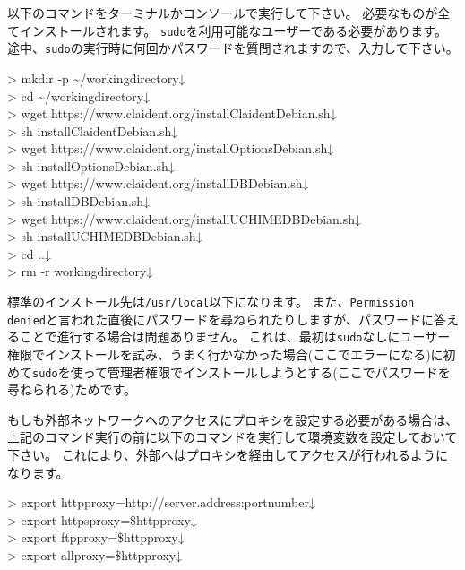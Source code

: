 \documentclass[titlepage,10pt,a4paper]{jsbook}
\newenvironment{cmd}{\begin{oframed}\raggedright\ttfamily\footnotesize\setlength{\baselineskip}{1.4em}}{\end{oframed}\vspace{-1em}}
\begin{document}
以下のコマンドをターミナルかコンソールで実行して下さい。
必要なものが全てインストールされます。
\texttt{sudo}を利用可能なユーザーである必要があります。
途中、\texttt{sudo}の実行時に何回かパスワードを質問されますので、入力して下さい。

\begin{cmd}
{\textgreater} mkdir -p {\textasciitilde}/workingdirectory↓\\
{\textgreater} cd {\textasciitilde}/workingdirectory↓\\
{\textgreater} wget https://www.claident.org/installClaident{\textunderscore}Debian.sh↓\\
{\textgreater} sh installClaident{\textunderscore}Debian.sh↓\\
{\textgreater} wget https://www.claident.org/installOptions{\textunderscore}Debian.sh↓\\
{\textgreater} sh installOptions{\textunderscore}Debian.sh↓\\
{\textgreater} wget https://www.claident.org/installDB{\textunderscore}Debian.sh↓\\
{\textgreater} sh installDB{\textunderscore}Debian.sh↓\\
{\textgreater} wget https://www.claident.org/installUCHIMEDB{\textunderscore}Debian.sh↓\\
{\textgreater} sh installUCHIMEDB{\textunderscore}Debian.sh↓\\
{\textgreater} cd ..↓\\
{\textgreater} rm -r workingdirectory↓
\end{cmd}

標準のインストール先は\texttt{/usr/local}以下になります。
また、\texttt{Permission denied}と言われた直後にパスワードを尋ねられたりしますが、パスワードに答えることで進行する場合は問題ありません。
これは、最初は\texttt{sudo}なしにユーザー権限でインストールを試み、うまく行かなかった場合(ここでエラーになる)に初めて\texttt{sudo}を使って管理者権限でインストールしようとする(ここでパスワードを尋ねられる)ためです。

もしも外部ネットワークへのアクセスにプロキシを設定する必要がある場合は、上記のコマンド実行の前に以下のコマンドを実行して環境変数を設定しておいて下さい。
これにより、外部へはプロキシを経由してアクセスが行われるようになります。

\begin{cmd}
{\textgreater} export http{\textunderscore}proxy=http://server.address:portnumber↓\\
{\textgreater} export https{\textunderscore}proxy=\$http{\textunderscore}proxy↓\\
{\textgreater} export ftp{\textunderscore}proxy=\$http{\textunderscore}proxy↓\\
{\textgreater} export all{\textunderscore}proxy=\$http{\textunderscore}proxy↓
\end{cmd}
\end{document}
